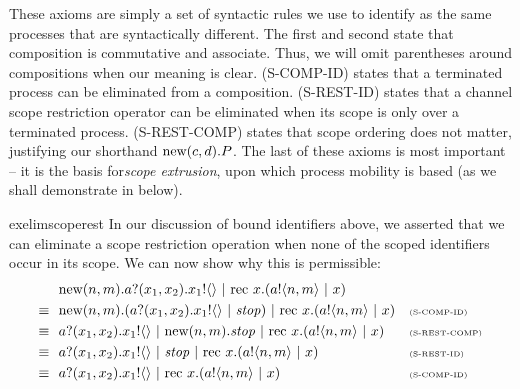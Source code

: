 	These axioms are simply a set of syntactic rules we use to identify as the same processes that are syntactically different.  
The first and second state that composition is commutative and associate.  
Thus, we will omit parentheses around compositions when our meaning is clear.  
(S-COMP-ID) states that a terminated process can be eliminated from a composition.  
(S-REST-ID) states that a channel scope restriction operator can be eliminated when its scope is only over a terminated process. (S-REST-COMP) states that scope ordering does not matter, justifying our shorthand $\text{new}({c,d}). P$.  
The last of these axioms is most important -- it is the basis for\emph{scope extrusion}, upon which process mobility is based (as we shall demonstrate in  below).
	
	\begin{example}{exelimscoperest}
		In our discussion of bound identifiers above, we asserted that we can eliminate a scope restriction operation when none of the scoped identifiers occur in its scope. 
		We can now show why this is permissible:
		\begin{align*}
			&\ \text{new}({n,m}).{a}?({x_1,x_2}).{x_1}!\langle{}\rangle\ |\  \text{rec }{x}.({a}!\langle{n,m}\rangle \ |\  x) &&\\
			\equiv\ &\ \text{new}({n,m}).({a}?({x_1,x_2}).{x_1}!\langle{}\rangle \ |\  \mbox{\emph{stop}})\ |\  \text{rec }{x}.({a}!\langle{n,m}\rangle \ |\  x) && \text{\tiny{(S-COMP-ID)}}\\
			\equiv\ &\ {a}?({x_1,x_2}).{x_1}!\langle{}\rangle \ |\  \text{new}({n,m}).\mbox{\emph{stop}}\ |\  \text{rec }{x}.({a}!\langle{n,m}\rangle \ |\  x) && \text{\tiny{(S-REST-COMP)}}\\
			\equiv\ &\ {a}?({x_1,x_2}).{x_1}!\langle{}\rangle \ |\  \mbox{\emph{stop}} \ |\  \text{rec }{x}.({a}!\langle{n,m}\rangle \ |\  x) && \text{\tiny{(S-REST-ID)}}\\
			\equiv\ &\ {a}?({x_1,x_2}).{x_1}!\langle{}\rangle \ |\  \text{rec }{x}.({a}!\langle{n,m}\rangle \ |\  x) && \text{\tiny{(S-COMP-ID)}}
		\end{align*}
	\end{example}
